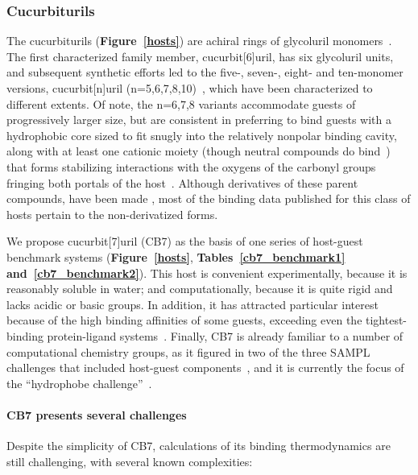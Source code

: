 \documentclass[aps,pre,twocolumn,nofootinbib,superscriptaddress,10pt, final,tightenlines]{revtex4-1}
\begin{document}
\subsubsection{Cucurbiturils}

The cucurbiturils ({\bf Figure~\ref{hosts}}) are achiral rings of glycoluril monomers~\cite{freeman_cucurbituril_1981}. The first characterized family member, cucurbit[6]uril, has six glycoluril units, and subsequent synthetic efforts led to the five-, seven-, eight- and ten-monomer versions, cucurbit[n]uril (n=5,6,7,8,10)~\cite{liu_cucurbituril_2005},
which have been characterized to different extents. 
Of note, the n=6,7,8 variants accommodate guests of progressively larger size, but are consistent in preferring to bind guests with a hydrophobic core sized to fit snugly into the relatively nonpolar binding cavity, along with at least one cationic moiety (though neutral compounds do bind~\cite{wyman_cucurbituril_2008, lee_deciphering_2015}) that forms stabilizing interactions with the oxygens of the carbonyl groups fringing both portals of the host~\cite{liu_cucurbituril_2005}. 
Although derivatives of these parent compounds, have been made \cite{Lee:2003:AccountsofChemicalResearch, vinciguerra_synthesis_2015, assaf_cucurbiturils:_2015, Cong:2016:Org.Biomol.Chem.},
most of the binding data published for this class of hosts pertain to the non-derivatized forms. 


We propose cucurbit[7]uril (CB7) as the basis of one series of host-guest benchmark systems ({\bf Figure~\ref{hosts}}, {\bf Tables~\ref{cb7_benchmark1} and~\ref{cb7_benchmark2}}). 
This host is convenient experimentally, because it is reasonably soluble in water; and computationally, because it is quite rigid and lacks acidic or basic groups. 
In addition, it has attracted particular interest because of the high binding affinities of some guests, exceeding even the tightest-binding protein-ligand systems~\cite{liu_cucurbituril_2005, rekharsky_synthetic_2007, moghaddam_hostguest_2009, cao_attomolar_2014}.  
Finally, CB7 is already familiar to a number of computational chemistry groups, as it figured in two of the three SAMPL challenges that included host-guest components~\cite{muddana_sampl3_2012, muddana_sampl4_2014}, and it is currently the focus of the ``hydrophobe challenge''~\cite{schreiner_theoretical_2016}. 
 
\paragraph{CB7 presents several challenges} Despite the simplicity of CB7, calculations of its binding thermodynamics are still challenging, with several known complexities:
\end{document}
